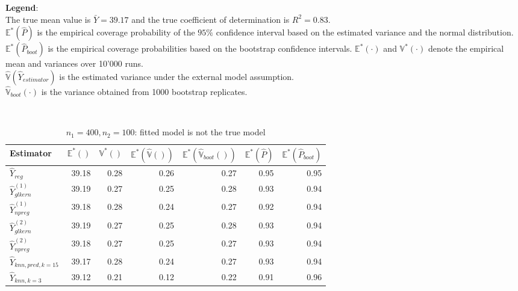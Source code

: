 \documentclass[a4paper,12pt,leqno, titlepage]{article}
\newcommand{\EX}{\mathbb{E}}
\newcommand{\VAR}{\mathbb{V}}
\begin{document}
\normalsize
\noindent\textbf{Legend}: \\
The true mean value is $\bar{Y}=39.17$ and the true coefficient of determination is $R^2=0.83$.\\
$\EX^*(\hat{P})$ is the empirical coverage probability of the $95\%$ confidence interval based on the estimated variance and the normal distribution.\\
$\EX^*(\hat{P}_{boot})$ is the empirical coverage probabilities based on the bootstrap confidence intervals.
$\EX^*(\cdot)$ and $\VAR^*(\cdot)$ denote the empirical mean and variances over 10'000 runs.\\
$\hat{\VAR}(\hat{Y}_{estimator})$ is the estimated variance under the external model assumption.\\
$\hat{\VAR}_{boot}(\cdot)$ is the variance obtained from 1000 bootstrap replicates.
\clearpage\newpage
\begin{table}[h]
\small
\centering
\caption{$n_1=400,n_2=100$: fitted model is not the true model }\label{simul3}\\[0.5cm]
\begin{tabular}{lrrrrrr}
  \hline
Estimator & $\EX^*()$ & $\VAR^*()$ & $\EX^*(\hat{\VAR}())$ & $\EX^*(\hat{\VAR}_{boot}())$ & $\EX^*(\hat{P})$ & $\EX^*(\hat{P}_{boot})$ \\ \hline\hline
 $\hat{Y}_{reg}$              & 39.18 & 0.28 & 0.26 &0.27 &0.95 & 0.95 \\ \hline
 $\hat{Y}^{(1)}_{glkern}$     & 39.19 & 0.27 & 0.25 &0.28 &0.93 & 0.94\\
 $\hat{Y}^{(1)}_{npreg}$      & 39.18 & 0.28 & 0.24 &0.27 &0.92 & 0.94   \\ \hline
 $\hat{Y}^{(2)}_{glkern}$     & 39.19 & 0.27 & 0.25 &0.28 &0.93 & 0.94\\
 $\hat{Y}^{(2)}_{npreg}$      & 39.18 & 0.27 & 0.25 &0.27 &0.93 & 0.94  \\ \hline
 $\hat{Y}_{knn,pred,k=15}$    & 39.17 & 0.28 & 0.24 &0.27 &0.93 & 0.94\\
 $\hat{Y}_{knn,k=3}$          & 39.12 & 0.21 & 0.12 &0.22 &0.91 & 0.96  \\ \hline \hline
\end{tabular}
\end{table}
\end{document}
